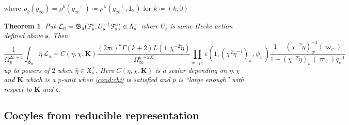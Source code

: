 \documentclass[leqno]{amsart}
\newcommand{\euF}{\EuScript{F}} %
\newcommand{\wt}[1]{\underline{ #1 }}
\newcommand{\bwt}[1]{\underline{\boldsymbol { #1 }}}
\newcommand{\fG}{\mathfrak{G}}
\newcommand{\fX}{\mathfrak{X}}
\newcommand{\B}{\mathfrak B}
\newcommand{\id}{\mathbf{1}}
\newcommand{\K}{{\mathbf{K}}} %
\newcommand{\fc}{\mathfrak{c}}
\newcommand{\fs}{\mathfrak{s}}
\newcommand{\fn}{\mathfrak{n}}
\newtheorem{thm}{Theorem}[section]
\theoremstyle{definition}
\theoremstyle{remark}
\begin{document}
where $\rho_{\wt{k}}(g_\infty)=\rho^{\wt{k}}(g_\infty^{-\intercal})
\coloneqq \rho^{\bwt{k}}(g_\infty^{-\intercal},\id_2)$
for $\wt{k}\coloneqq (k,0)$



\begin{thm}\label{thm:intro2}
    Put $\mathcal{L}_\fn=\B_\fn(\euF^\circ_{\fs},U_\fs^{-1}\euF^\circ_{\fs})
    \in \Lambda_{\fs}^-$
    where $U_\fs$ is some Hecke action defined above $\fs$. Then
    \begin{equation*}
        \frac{1}{\Omega_p^{2k+4}}
        \int_{\fG_{\fn}}\hat{\eta}\,\mathcal{L}_\fn=
    C(\eta,\chi,\K)
    \frac{(2\pi i)^{k}\Gamma(k+2)L(1,\chi^{-2}\tilde{\eta})}{\Omega_\infty^{k+2\Sigma}}
    \prod_{w\mid p\fs}
    \varepsilon(1,(\chi^{2}\tilde{\eta}^{-1})_w,\psi_w)
    \frac{1-(\chi^{-2}\tilde{\eta})^{-1}_w(\varpi_v)}
    {1-(\chi^{-2}\tilde{\eta})_w(\varpi_v)q_v^{-1}}
    \end{equation*}
    up to powers of $2$
    when $\hat{\eta}\in \fX^+_{\fs}$.
    Here $C(\eta,\chi,\K)$ is a scalar depending on $\eta,\chi$ and $\K$
    which is a $p$-unit when \eqref{cond:chi} is satisfied 
    and $p$ is ``large enough''
    with respect to $\K$ and $\fc$. 
\end{thm}


\subsection{Cocyles from reducible representation}
\end{document}
